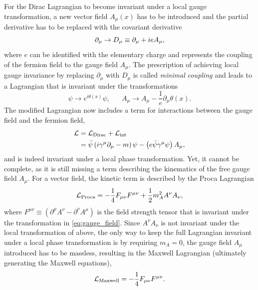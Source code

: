 For the Dirac Lagrangian to become invariant under a local gauge transformation, a new vector field $A_\mu(x)$ has to be introduced and the partial derivative has to be replaced with the covariant derivative
\begin{equation}
	\partial_\mu \rightarrow \mathop{}\!D_\mu \equiv \partial_\mu + ieA_\mu,
\end{equation}
where $e$ can be identified with the elementary charge and represents the coupling of the fermion field to the gauge field $A_\mu$. The prescription of achieving local gauge invariance by replacing $\partial_\mu$ with $D_\mu$ is called \textit{minimal coupling} and leads to a Lagrangian that is invariant under the transformations
\begin{equation}
	\psi \rightarrow e^{i\theta\left(x\right)}\psi,\, \, \, \, \, \, \, \, \, \, A_\mu \rightarrow A_\mu - \frac{1}{e}\partial_\mu\theta(x).
	\label{eq:gauge_field}
\end{equation}
The modified Lagrangian now includes a term for interactions between the gauge field and the fermion field,
\begin{equation}
\begin{split}
	\mathcal{L} &= \mathcal{L}_\mathrm{Dirac} + \mathcal{L}_\mathrm{int} \\
		&= \bar{\psi}\left(i\gamma^\mu\partial_\mu - m\right)\psi - \left(e\bar{\psi}\gamma^\mu\psi\right)A_\mu,
	\label{eq:modified_lagrangian}
\end{split}
\end{equation}
and is indeed invariant under a local phase transformation. Yet, it cannot be complete, as it is still missing a term describing the kinematics of the free gauge field $A_\mu$. For a vector field, the kinetic term is described by the Proca Lagrangian
\begin{equation}
	\mathcal{L}_\mathrm{Proca} = -\frac{1}{4}F_{\mu\nu}F^{\mu\nu} + \frac{1}{2}m_A^2A^\nu A_\nu,
\end{equation}
where $F^{\mu\nu}\equiv\left(\partial^\mu A^\nu-\partial^\nu A^\mu\right)$ is the field strength tensor that is invariant under the transformation in \cref{eq:gauge_field}. Since $A^\nu A_\nu$ is not invariant under the local transformation of above, the only way to keep the full Lagrangian invariant under a local phase transformation is by requiring $m_A=0$, \ie the gauge field $A_\mu$ introduced has to be massless, resulting in the Maxwell Lagrangian (ultimately generating the Maxwell equations),
\begin{equation}
	\mathcal{L}_\mathrm{Maxwell} = -\frac{1}{4}F_{\mu\nu}F^{\mu\nu}.
\end{equation}

